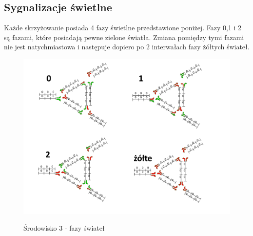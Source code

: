 \documentclass[12pt]{book}
\theoremstyle{plain}
\begin{document}
\subsection{Sygnalizacje świetlne}
Każde skrzyżowanie posiada 4 fazy świetlne przedstawione poniżej. Fazy 0,1 i 2 są fazami, które posiadają pewne zielone światła. Zmiana pomiędzy tymi fazami nie jest natychmiastowa i następuje dopiero po 2 interwałach fazy żółtych świateł.
\begin{figure}[H]
	\centering
	\includegraphics[width=14cm]{env_4_fazy}
	\label{fig:env_4_fazy}
	\caption{Środowisko 3 - fazy świateł}
\end{figure}
\end{document}
